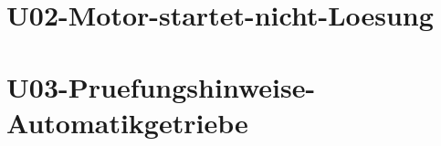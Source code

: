 \chapter{U02-Motor-startet-nicht-Loesung}
%
\chapter{U03-Pruefungshinweise-Automatikgetriebe}
%



%
%



%



